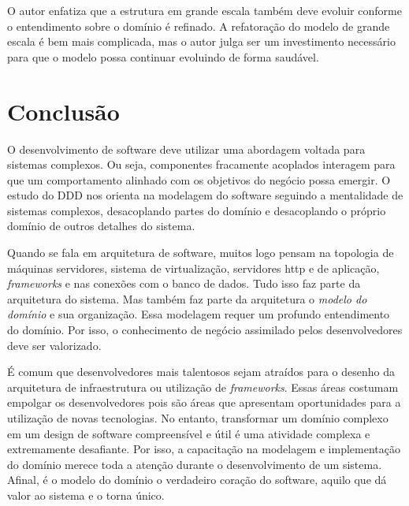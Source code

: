 \documentclass[a4paper, 12pt]{article}
\begin{document}
O autor enfatiza que a estrutura em grande escala também deve evoluir conforme o entendimento sobre o domínio é refinado. A refatoração do modelo de grande escala é bem mais complicada, mas o autor julga ser um investimento necessário para que o modelo possa continuar evoluindo de forma saudável.

\section{Conclusão}

O desenvolvimento de software deve utilizar uma abordagem voltada para sistemas complexos. Ou seja, componentes fracamente acoplados interagem para que um comportamento alinhado com os objetivos do negócio possa emergir. O estudo do DDD nos orienta na modelagem do software seguindo a mentalidade de sistemas complexos, desacoplando partes do domínio e desacoplando o próprio domínio de outros detalhes do sistema. 

Quando se fala em arquitetura de software, muitos logo pensam na topologia de máquinas servidores, sistema de virtualização, servidores http e de aplicação, \emph{frameworks} e nas conexões com o banco de dados. Tudo isso faz parte da arquitetura do sistema. Mas também faz parte da arquitetura o \emph{modelo do domínio} e sua organização. Essa modelagem requer um profundo entendimento do domínio. Por isso, o conhecimento de negócio assimilado pelos desenvolvedores deve ser valorizado.

É comum que desenvolvedores mais talentosos sejam atraídos para o desenho da arquitetura de infraestrutura ou utilização de \emph{frameworks}. Essas áreas costumam empolgar os desenvolvedores pois são áreas que apresentam oportunidades para a utilização de novas tecnologias. No entanto, transformar  um domínio complexo em um design de software compreensível e útil é uma atividade complexa e extremamente desafiante. Por isso, a capacitação na modelagem e implementação do domínio merece toda a atenção durante o desenvolvimento de um sistema. Afinal, é o modelo do domínio o verdadeiro coração do software, aquilo que dá valor ao sistema e o torna único.

\small


  
\end{document}

